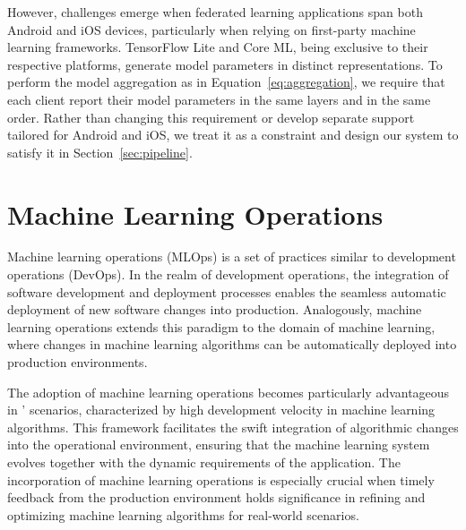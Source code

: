 However,
challenges emerge when federated learning applications span both Android and iOS
devices, particularly when relying on first-party machine learning frameworks.
TensorFlow Lite and Core ML, being exclusive to their respective platforms,
generate model parameters in distinct representations.
To perform the model aggregation as in Equation~\ref{eq:aggregation},
we require that each client report their model parameters in the same layers and
in the same order.
Rather than changing this requirement or develop separate support tailored for
Android and iOS,
we treat it as a constraint and design our system to satisfy it in
Section~\ref{sec:pipeline}.

\section{Machine Learning Operations}

Machine learning operations (MLOps)
is a set of practices similar to development operations (DevOps).
In the realm of development operations,
the integration of software development and deployment processes enables the
seamless automatic deployment of new software changes into production.
Analogously,
machine learning operations extends this paradigm to the domain of machine
learning,
where changes in machine learning algorithms can be automatically deployed into
production environments.

The adoption of machine learning operations becomes particularly advantageous in
\fedcampus' scenarios,
characterized by high development velocity in machine learning algorithms.
This framework facilitates the swift integration of algorithmic changes into the
operational environment,
ensuring that the machine learning system evolves together with the dynamic
requirements of the application.
The incorporation of machine learning operations is especially crucial when
timely feedback from the production environment holds significance in refining
and optimizing machine learning algorithms for real-world scenarios.
